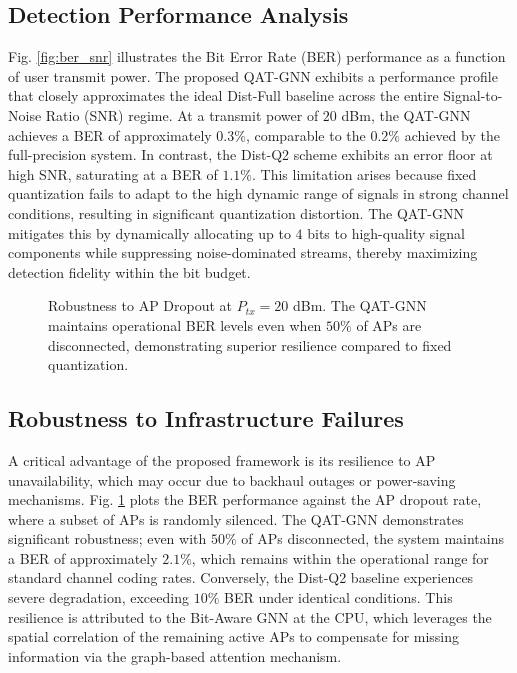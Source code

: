 \subsection{Detection Performance Analysis}
Fig. \ref{fig:ber_snr} illustrates the Bit Error Rate (BER) performance as a function of user transmit power. The proposed QAT-GNN exhibits a performance profile that closely approximates the ideal Dist-Full baseline across the entire Signal-to-Noise Ratio (SNR) regime. At a transmit power of $20$ dBm, the QAT-GNN achieves a BER of approximately $0.3\%$, comparable to the $0.2\%$ achieved by the full-precision system. In contrast, the Dist-Q2 scheme exhibits an error floor at high SNR, saturating at a BER of $1.1\%$. This limitation arises because fixed quantization fails to adapt to the high dynamic range of signals in strong channel conditions, resulting in significant quantization distortion. The QAT-GNN mitigates this by dynamically allocating up to $4$ bits to high-quality signal components while suppressing noise-dominated streams, thereby maximizing detection fidelity within the bit budget.

\begin{figure}[t!]
    \centering
    
    \caption{Robustness to AP Dropout at $P_{tx}=20$ dBm. The QAT-GNN maintains operational BER levels even when $50\%$ of APs are disconnected, demonstrating superior resilience compared to fixed quantization.}
    \label{fig:dropout}
\end{figure}

\subsection{Robustness to Infrastructure Failures}
A critical advantage of the proposed framework is its resilience to AP unavailability, which may occur due to backhaul outages or power-saving mechanisms. Fig. \ref{fig:dropout} plots the BER performance against the AP dropout rate, where a subset of APs is randomly silenced. The QAT-GNN demonstrates significant robustness; even with $50\%$ of APs disconnected, the system maintains a BER of approximately $2.1\%$, which remains within the operational range for standard channel coding rates. Conversely, the Dist-Q2 baseline experiences severe degradation, exceeding $10\%$ BER under identical conditions. This resilience is attributed to the Bit-Aware GNN at the CPU, which leverages the spatial correlation of the remaining active APs to compensate for missing information via the graph-based attention mechanism.

